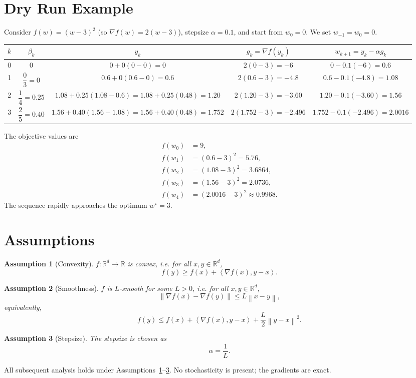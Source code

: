 \documentclass{article}
\newtheorem{assumption}{Assumption}
\newcommand{\norm}[1]{\left\lVert#1\right\rVert}
\newcommand{\ip}[2]{\left\langle #1,#2\right\rangle}
\begin{document}
\section*{Dry Run Example}
Consider $f(w)=(w-3)^2$ (so $\nabla f(w)=2(w-3)$), stepsize $\alpha=0.1$, and start from $w_0=0$.
We set $w_{-1}=w_0=0$.

\begin{center}
\begin{tabular}{c|c|c|c|c}
$k$ & $\beta_k$ & $y_k$ & $g_k=\nabla f(y_k)$ & $w_{k+1}=y_k-\alpha g_k$ \\ \hline
0 & $0$ & $0+0(0-0)=0$ & $2(0-3)=-6$ & $0-0.1(-6)=0.6$ \\ \hline
1 & $\dfrac{0}{3}=0$ & $0.6+0(0.6-0)=0.6$ & $2(0.6-3)=-4.8$ & $0.6-0.1(-4.8)=1.08$ \\ \hline
2 & $\dfrac{1}{4}=0.25$ & $1.08+0.25(1.08-0.6)=1.08+0.25(0.48)=1.20$ & $2(1.20-3)=-3.60$ & $1.20-0.1(-3.60)=1.56$ \\ \hline
3 & $\dfrac{2}{5}=0.40$ & $1.56+0.40(1.56-1.08)=1.56+0.40(0.48)=1.752$ & $2(1.752-3)=-2.496$ & $1.752-0.1(-2.496)=2.0016$
\end{tabular}
\end{center}

The objective values are
\[
\begin{aligned}
f(w_0)&=9,\\
f(w_1)&=(0.6-3)^2=5.76,\\
f(w_2)&=(1.08-3)^2=3.6864,\\
f(w_3)&=(1.56-3)^2=2.0736,\\
f(w_4)&=(2.0016-3)^2\approx 0.9968.
\end{aligned}
\]
The sequence rapidly approaches the optimum $w^\star=3$.

\newpage
\section*{Assumptions}
\begin{assumption}[Convexity]\label{ass:convex}
$f:\mathbb R^d\to\mathbb R$ is convex, i.e. for all $x,y\in\mathbb R^d$,
\[
f(y)\ge f(x)+\ip{\nabla f(x)}{y-x}.
\]
\end{assumption}
\begin{assumption}[Smoothness]\label{ass:smooth}
$f$ is $L$‑smooth for some $L>0$, i.e. for all $x,y\in\mathbb R^d$,
\[
\norm{\nabla f(x)-\nabla f(y)}\le L\norm{x-y},
\]
equivalently,
\[
f(y)\le f(x)+\ip{\nabla f(x)}{y-x}+\frac{L}{2}\norm{y-x}^2 .
\]
\end{assumption}
\begin{assumption}[Stepsize]\label{ass:stepsize}
The stepsize is chosen as
\[
\alpha = \frac{1}{L}.
\]
\end{assumption}
All subsequent analysis holds under Assumptions~\ref{ass:convex}–\ref{ass:stepsize}. No stochasticity is present; the gradients are exact.
\end{document}
